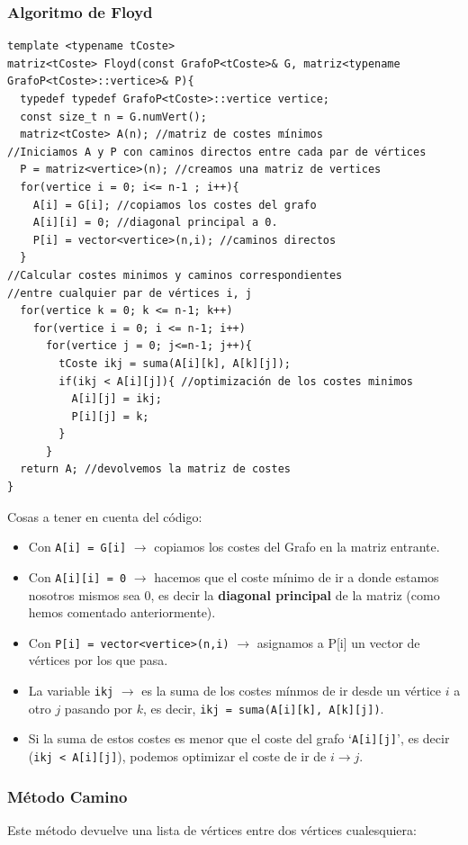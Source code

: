 \subsubsection{Algoritmo de Floyd}
\begin{verbatim}
template <typename tCoste> 
matriz<tCoste> Floyd(const GrafoP<tCoste>& G, matriz<typename GrafoP<tCoste>::vertice>& P){
  typedef typedef GrafoP<tCoste>::vertice vertice;
  const size_t n = G.numVert();
  matriz<tCoste> A(n); //matriz de costes mínimos
//Iniciamos A y P con caminos directos entre cada par de vértices
  P = matriz<vertice>(n); //creamos una matriz de vertices
  for(vertice i = 0; i<= n-1 ; i++){
    A[i] = G[i]; //copiamos los costes del grafo
    A[i][i] = 0; //diagonal principal a 0.
    P[i] = vector<vertice>(n,i); //caminos directos
  }
//Calcular costes minimos y caminos correspondientes
//entre cualquier par de vértices i, j
  for(vertice k = 0; k <= n-1; k++)
    for(vertice i = 0; i <= n-1; i++)
      for(vertice j = 0; j<=n-1; j++){
        tCoste ikj = suma(A[i][k], A[k][j]);
        if(ikj < A[i][j]){ //optimización de los costes minimos
          A[i][j] = ikj;
          P[i][j] = k;
        }
      }
  return A; //devolvemos la matriz de costes
}
\end{verbatim}

Cosas a tener en cuenta del código:
\begin{itemize}
  \item Con \texttt{A[i] = G[i]} \(\rightarrow\) copiamos los costes del Grafo en la matriz entrante.
  \item Con \texttt{A[i][i] = 0} \(\rightarrow\) hacemos que el coste mínimo de ir a donde estamos nosotros mismos sea 0, es decir la \textbf{diagonal principal} de la matriz (como hemos comentado anteriormente).
  \item Con \texttt{P[i] = vector<vertice>(n,i)} \(\rightarrow\) asignamos a P[i] un vector de vértices por los que pasa.
  \item La variable \texttt{ikj} \(\rightarrow\) es la suma de los costes mínmos de ir desde un vértice \(i\) a otro \(j\) pasando por \(k\), es decir, \texttt{ikj = suma(A[i][k], A[k][j])}. 
  \item Si la suma de estos costes es menor que el coste del grafo `\texttt{A[i][j]}', es decir (\texttt{ikj < A[i][j]}), podemos optimizar el coste de ir de \(i \rightarrow j\).
\end{itemize}

\subsubsection{Método Camino}
Este método devuelve una lista de vértices entre dos vértices cualesquiera:

